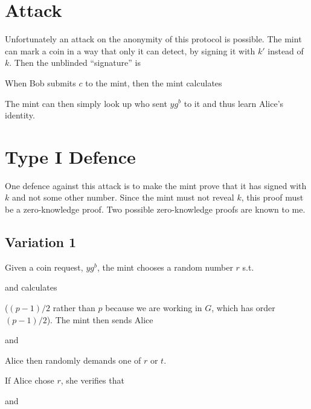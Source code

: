 \documentclass[a4paper,titlepage]{article}
\begin{document}
\section{Attack\cite{Anon1}}

Unfortunately an attack on the anonymity of this protocol is
possible. The mint can mark a coin in a way that only it can detect,
by signing it with $k'$ instead of $k$. Then the unblinded
``signature'' is


When Bob submits $c$ to the mint, then the mint calculates


The mint can then simply look up who sent $y g^b$ to it and thus learn
Alice's identity.

\section{Type I Defence}

One defence against this attack is to make the mint prove that it has
signed with $k$ and not some other number. Since the mint must not
reveal $k$, this proof must be a zero-knowledge proof. Two possible
zero-knowledge proofs are known to me.

\subsection{Variation 1\cite{Goldberg2}}

Given a coin request, $y g^b$, the mint chooses a random number $r$
 s.t.


and calculates


($(p-1)/2$ rather than $p$ because we are working in $G$, which has order
$(p-1)/2$). The mint then sends Alice


and


Alice then randomly demands one of $r$ or $t$.

If Alice chose $r$, she verifies that


and

\end{document}
